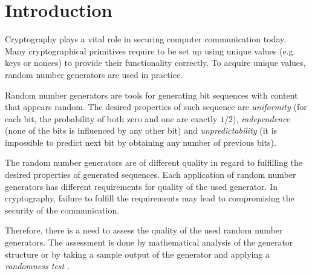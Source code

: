 \documentclass[
  digital,     %
  oneside,     %
  nosansbold,  %
  nocolorbold, %
  nolof,         %
  nolot,         %
]{fithesis4}
\begin{document}
\chapter*{Introduction}

Cryptography plays a vital role in securing computer communication today. Many cryptographical primitives require to be set up using unique values (e.g. keys or nonces) to provide their functionality correctly. To acquire unique values, random number generators are used in practice.


Random number generators are tools for generating bit sequences with content that appears random. The desired properties \cite[p.~1-1]{nist_special} of such sequence are \emph{uniformity} (for each bit, the probability of both zero and one are exactly $1/2$), \emph{independence} (none of the bits is influenced by any other bit) and \emph{unpredictability} (it is impossible to predict next bit by obtaining any number of previous bits). 

The random number generators are of different quality in regard to fulfilling the desired properties of generated sequences. Each application of random number generators has different requirements for quality of the used generator. In cryptography, failure to fulfill the requirements may lead to compromising the security of the communication.

Therefore, there is a need to assess the quality of the used random number generators. The assessment is done by mathematical analysis of the generator structure or by taking a sample output of the generator and applying a \emph{randomness test} \cite[p.~2]{tu01_guide}.
\end{document}
